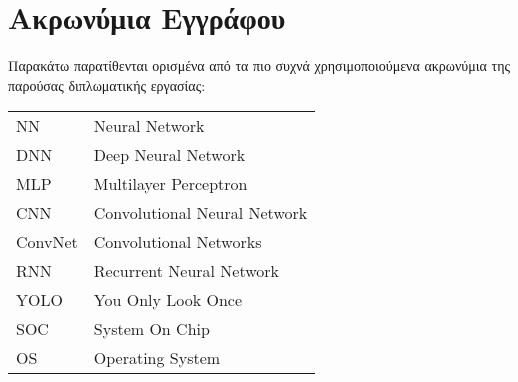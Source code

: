 \chapter*{Ακρωνύμια Εγγράφου}
\label{append:acronyms}
{}

Παρακάτω παρατίθενται ορισμένα από τα πιο συχνά χρησιμοποιούμενα ακρωνύμια της
παρούσας διπλωματικής εργασίας:

\begin{table}[htpb]
  \centering
  \begin{tabular}{l@{$\;\;\longrightarrow\;\;$}l}
    NN & Neural Network \\
    DNN & Deep Neural Network \\
    MLP & Multilayer Perceptron \\
    CNN & Convolutional Neural Network \\
    ConvNet & Convolutional Networks \\
    RNN & Recurrent Neural Network \\
    YOLO & You Only Look Once \\
    SOC & System On Chip \\
    OS & Operating System
  \end{tabular}
\end{table}

